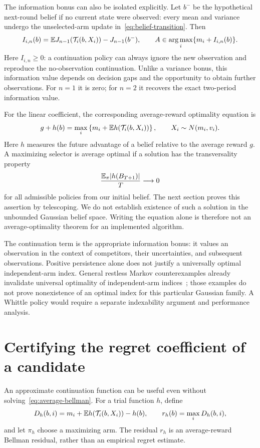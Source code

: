 The information bonus can also be isolated explicitly. Let $b^-$ be the hypothetical next-round belief if no current state were observed: every mean and variance undergo the unselected-arm update in~\eqref{eq:belief-transition}. Then
\[
I_{i,n}(b)=\mathbb E J_{n-1}(\mathcal T_i(b,X_i))-J_{n-1}(b^-),
\qquad A\in\operatorname*{arg\,max}_i\{m_i+I_{i,n}(b)\}.
\]
Here $I_{i,n}\geq0$: a continuation policy can always ignore the new observation and reproduce the no-observation continuation. Unlike a variance bonus, this information value depends on decision gaps and the opportunity to obtain further observations. For $n=1$ it is zero; for $n=2$ it recovers the exact two-period information value.

For the linear coefficient, the corresponding average-reward optimality equation is
\begin{equation}
g+h(b)=\max_i\left\{m_i+\mathbb E h(\mathcal T_i(b,X_i))\right\},
\qquad X_i\sim N(m_i,v_i).
\label{eq:average-bellman}
\end{equation}
Here $h$ measures the future advantage of a belief relative to the average reward $g$. A maximizing selector is average optimal if a solution has the transversality property
\begin{equation}
\frac{\mathbb E_\pi|h(B_{T+1})|}{T}\longrightarrow0
\label{eq:transversality}
\end{equation}
for all admissible policies from our initial belief. The next section proves this assertion by telescoping. We do not establish existence of such a solution in the unbounded Gaussian belief space. Writing the equation alone is therefore not an average-optimality theorem for an implemented algorithm.

The continuation term is the appropriate information bonus: it values an observation in the context of competitors, their uncertainties, and subsequent observations. Positive persistence alone does not justify a universally optimal independent-arm index. General restless Markov counterexamples already invalidate universal optimality of independent-arm indices~\cite{ortner2014}; those examples do not prove nonexistence of an optimal index for this particular Gaussian family. A Whittle policy would require a separate indexability argument and performance analysis.

\section{Certifying the regret coefficient of a candidate}
\label{sec:certificate}
An approximate continuation function can be useful even without solving~\eqref{eq:average-bellman}. For a trial function $h$, define
\begin{equation}
D_h(b,i)=m_i+\mathbb E h(\mathcal T_i(b,X_i))-h(b),\qquad
r_h(b)=\max_iD_h(b,i),
\end{equation}
and let $\pi_h$ choose a maximizing arm. The residual $r_h$ is an average-reward Bellman residual, rather than an empirical regret estimate.

